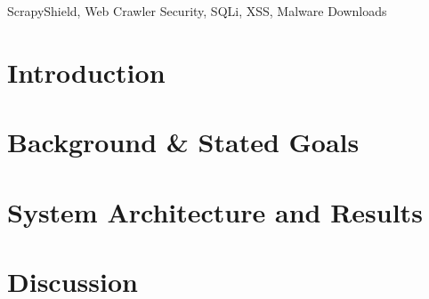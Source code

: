 \maketitle

\begin{abstract}
  
\end{abstract}

\begin{IEEEkeywords}
  ScrapyShield, Web Crawler Security, SQLi, XSS, Malware Downloads
\end{IEEEkeywords}

\section{Introduction}


\section{Background \& Stated Goals}


\section{System Architecture and Results}


\section{Discussion}






\nocite{*}




